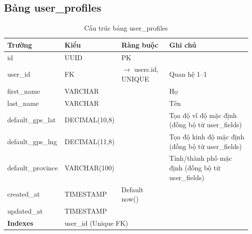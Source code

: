 \documentclass[12pt,a4paper]{article}
\begin{document}
\subsection{Bảng user\_profiles}
\begin{longtable}{|l|l|l|p{5.5cm}|}
    \caption{Cấu trúc bảng user\_profiles}                                                                                                             \\
    \hline
    \rowcolor{headerblue}
    \textbf{Trường}   & \textbf{Kiểu}                             & \textbf{Ràng buộc}             & \textbf{Ghi chú}                                  \\
    \hline
    id                & UUID                                      & PK                             &                                                   \\
    \hline
    user\_id          & FK                                        & $\rightarrow$ users.id, UNIQUE & Quan hệ 1--1                                      \\
    \hline
    first\_name       & VARCHAR                                   &                                & Họ                                                \\
    \hline
    last\_name        & VARCHAR                                   &                                & Tên                                               \\
    \hline
    default\_gps\_lat & DECIMAL(10,8)                             &                                & Tọa độ vĩ độ mặc định (đồng bộ từ user\_fields)   \\
    \hline
    default\_gps\_lng & DECIMAL(11,8)                             &                                & Tọa độ kinh độ mặc định (đồng bộ từ user\_fields) \\
    \hline
    default\_province & VARCHAR(100)                              &                                & Tỉnh/thành phố mặc định (đồng bộ từ user\_fields) \\
    \hline
    created\_at       & TIMESTAMP                                 & Default now()                  &                                                   \\
    \hline
    updated\_at       & TIMESTAMP                                 &                                &                                                   \\
    \hline
    \rowcolor{headerblue}
    \textbf{Indexes}  & \multicolumn{3}{l|}{user\_id (Unique FK)}                                                                                      \\
    \hline
\end{longtable}
\end{document}
